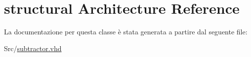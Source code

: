 \hypertarget{classsubtractor_1_1structural}{\section{structural Architecture Reference}
\label{classsubtractor_1_1structural}
}


La documentazione per questa classe è stata generata a partire dal seguente file\+:\begin{DoxyCompactItemize}
\item 
Src/\hyperlink{subtractor_8vhd}{subtractor.\+vhd}\end{DoxyCompactItemize}
